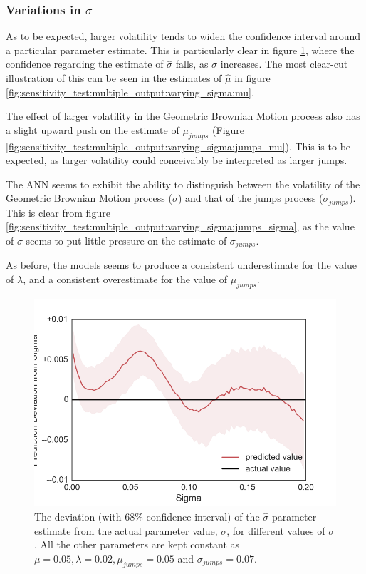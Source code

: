 \documentclass[11pt,oneside,openany,a4paper,english, report, goldenblock
]{usthesis}
\begin{document}
\subsubsection{Variations in $\sigma$}
As to be expected, larger volatility tends to widen the confidence interval around a particular parameter estimate. This is particularly clear in figure \ref{fig:sensitivity_test:multiple_output:varying_sigma:sigma}, where the confidence regarding the estimate of $\hat{\sigma}$ falls, as $\sigma$ increases.
The most clear-cut illustration of this can be seen in the estimates of $\hat{\mu}$ in figure \ref{fig:sensitivity_test:multiple_output:varying_sigma:mu}.

The effect of larger volatility in the Geometric Brownian Motion process also has a slight upward push on the estimate of $\mu_{jumps}$ (Figure \ref{fig:sensitivity_test:multiple_output:varying_sigma:jumps_mu}). This is to be expected, as larger volatility could conceivably be interpreted as larger jumps. 

The ANN seems to exhibit the ability to distinguish between the volatility of the Geometric Brownian Motion process ($\sigma$) and that of the jumps process ($\sigma_{jumps}$). This is clear from figure \ref{fig:sensitivity_test:multiple_output:varying_sigma:jumps_sigma}, as the value of $\sigma$ seems to put little pressure on the estimate of $\sigma_{jumps}$.

As before, the models seems to produce a consistent underestimate for the value of $\lambda$, and a consistent overestimate for the value of $\mu_{jumps}$.

\begin{figure}[h]
	\centering
	\includegraphics[width=0.7\linewidth]{Images/Output-Sensitivity-Results/ConvolutionalNN-MultipleOutput-ELU/Varying-Sigma/Sigma}
	\caption{The deviation (with $68\%$ confidence interval) of the $\hat{\sigma}$ parameter estimate from the actual parameter value, $\sigma$, for different values of $\sigma$. All the other parameters are kept constant as $\mu = 0.05, \lambda = 0.02, \mu_{jumps} = 0.05$ and $\sigma_{jumps} = 0.07$.}
	\label{fig:sensitivity_test:multiple_output:varying_sigma:sigma}
\end{figure}
\end{document}
